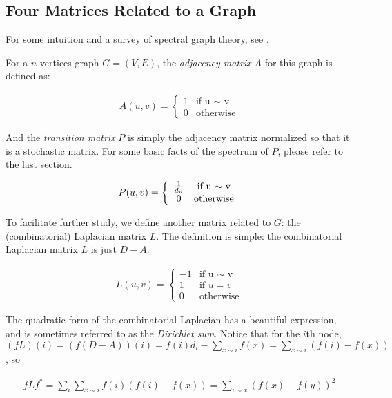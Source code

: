 \subsection{Four Matrices Related to a Graph}
For some intuition and a survey of spectral graph theory, see
\cite{spectral}. 

For a $n$-vertices graph $G=(V, E)$, the \emph{adjacency matrix} $A$
for this graph is defined as:

\begin{eqnarray*}
A(u,v)=\left\{
\begin{array}{cc}
1 & \textrm{if u $\sim$ v}\\
0 & \textrm{otherwise}
\end{array}
\right.
\end{eqnarray*}

And the \emph{transition matrix} $P$ is simply the adjacency matrix
normalized so that it is a stochastic matrix. For some basic facts
of the spectrum of $P$, please refer to the last section.

\begin{eqnarray*}
P(u,v)=\left\{
\begin{array}{cc}
1\over d_u & \textrm{if u $\sim$ v}\\
0 & \textrm{otherwise}
\end{array}
\right.
\end{eqnarray*}

To facilitate further study, we define another matrix related to
$G$: the (combinatorial) Laplacian matrix $L$. The definition is
simple: the combinatorial Laplacian matrix $L$ is just $D-A$.

\begin{eqnarray*}
L(u,v)=\left\{
\begin{array}{cc}
-1 & \textrm{if u $\sim$ v}\\
1 & \textrm{if $u=v$} \\
0 & \textrm{otherwise}
\end{array}
\right.
\end{eqnarray*}

The quadratic form of the combinatorial Laplacian has a beautiful
expression, and is sometimes referred to as the \emph{Dirichlet
sum}. Notice that for the $i$th node,
$(fL)(i)=(f(D-A))(i)=f(i)d_i-\sum_{x\sim i}f(x)=\sum_{x\sim
i}(f(i)-f(x))$, so

\begin{eqnarray*}
fLf^*=\sum_i \sum_{x\sim i}f(i)(f(i)-f(x))=\sum_{i\sim
x}(f(x)-f(y))^2
\end{eqnarray*}

